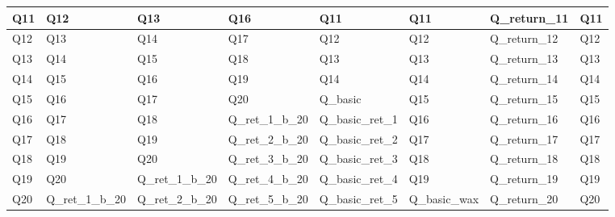 \documentclass[10pt]{article}
\begin{document}
\begin{landscape}
\begin{longtable}[c]{llllllll}
Q11  & Q12              & Q13              & Q16              & Q11              & Q11           & Q\_return\_11 & Q11  \\ \hline
Q12  & Q13              & Q14              & Q17              & Q12              & Q12           & Q\_return\_12 & Q12  \\ \hline
Q13  & Q14              & Q15              & Q18              & Q13              & Q13           & Q\_return\_13 & Q13  \\ \hline
Q14  & Q15              & Q16              & Q19              & Q14              & Q14           & Q\_return\_14 & Q14  \\ \hline
Q15  & Q16              & Q17              & Q20              & Q\_basic         & Q15           & Q\_return\_15 & Q15  \\ \hline
Q16  & Q17              & Q18              & Q\_ret\_1\_b\_20 & Q\_basic\_ret\_1 & Q16           & Q\_return\_16 & Q16  \\ \hline
Q17  & Q18              & Q19              & Q\_ret\_2\_b\_20 & Q\_basic\_ret\_2 & Q17           & Q\_return\_17 & Q17  \\ \hline
Q18  & Q19              & Q20              & Q\_ret\_3\_b\_20 & Q\_basic\_ret\_3 & Q18           & Q\_return\_18 & Q18  \\ \hline
Q19  & Q20              & Q\_ret\_1\_b\_20 & Q\_ret\_4\_b\_20 & Q\_basic\_ret\_4 & Q19           & Q\_return\_19 & Q19  \\ \hline
Q20  & Q\_ret\_1\_b\_20 & Q\_ret\_2\_b\_20 & Q\_ret\_5\_b\_20 & Q\_basic\_ret\_5 & Q\_basic\_wax & Q\_return\_20 & Q20  \\ \hline
\end{longtable}
\end{landscape}
\end{document}

